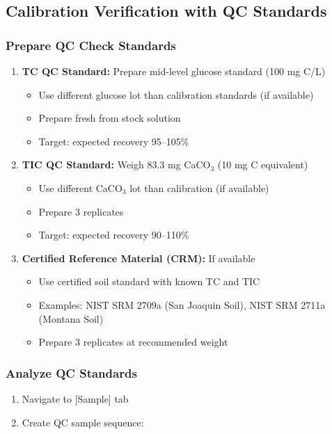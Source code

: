 \documentclass[11pt,a4paper]{article}\usepackage[]{graphicx}\usepackage[]{xcolor}
\begin{document}
\subsection{Calibration Verification with QC Standards}

\subsubsection{Prepare QC Check Standards}
\begin{enumerate}[noitemsep]
    \item \textbf{TC QC Standard:} Prepare mid-level glucose standard (100 mg C/L)
    \begin{itemize}
        \item Use different glucose lot than calibration standards (if available)
        \item Prepare fresh from stock solution
        \item Target: expected recovery 95--105\%
    \end{itemize}
    \item \textbf{TIC QC Standard:} Weigh 83.3 mg CaCO$_3$ (10 mg C equivalent)
    \begin{itemize}
        \item Use different CaCO$_3$ lot than calibration (if available)
        \item Prepare 3 replicates
        \item Target: expected recovery 90--110\%
    \end{itemize}
    \item \textbf{Certified Reference Material (CRM):} If available
    \begin{itemize}
        \item Use certified soil standard with known TC and TIC
        \item Examples: NIST SRM 2709a (San Joaquin Soil), NIST SRM 2711a (Montana Soil)
        \item Prepare 3 replicates at recommended weight
    \end{itemize}
\end{enumerate}

\subsubsection{Analyze QC Standards}
\begin{enumerate}[noitemsep]
    \item Navigate to [Sample] tab
    \item Create QC sample sequence:
\end{enumerate}
\end{document}
